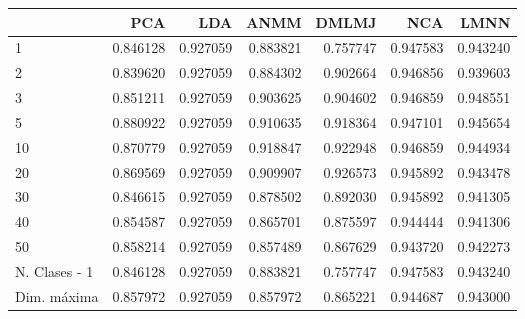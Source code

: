 \begin{tabular}{lrrrrrr}
\toprule
{} &       PCA &       LDA &      ANMM &     DMLMJ &       NCA &      LMNN \\
\midrule
1             &  0.846128 &  0.927059 &  0.883821 &  0.757747 &  0.947583 &  0.943240 \\
2             &  0.839620 &  0.927059 &  0.884302 &  0.902664 &  0.946856 &  0.939603 \\
3             &  0.851211 &  0.927059 &  0.903625 &  0.904602 &  0.946859 &  0.948551 \\
5             &  0.880922 &  0.927059 &  0.910635 &  0.918364 &  0.947101 &  0.945654 \\
10            &  0.870779 &  0.927059 &  0.918847 &  0.922948 &  0.946859 &  0.944934 \\
20            &  0.869569 &  0.927059 &  0.909907 &  0.926573 &  0.945892 &  0.943478 \\
30            &  0.846615 &  0.927059 &  0.878502 &  0.892030 &  0.945892 &  0.941305 \\
40            &  0.854587 &  0.927059 &  0.865701 &  0.875597 &  0.944444 &  0.941306 \\
50            &  0.858214 &  0.927059 &  0.857489 &  0.867629 &  0.943720 &  0.942273 \\
N. Clases - 1 &  0.846128 &  0.927059 &  0.883821 &  0.757747 &  0.947583 &  0.943240 \\
Dim. máxima   &  0.857972 &  0.927059 &  0.857972 &  0.865221 &  0.944687 &  0.943000 \\
\bottomrule
\end{tabular}

